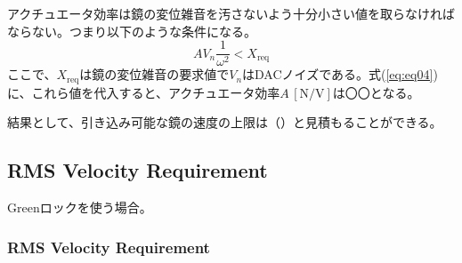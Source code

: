 \documentclass[a4paper,12pt]{jsarticle}
\begin{document}
アクチュエータ効率は鏡の変位雑音を汚さないよう十分小さい値を取らなければならない。つまり以下のような条件になる。
\begin{equation} \label{eq:eq04}
  A V_n  \frac{1}{\omega^2} < X_{\mathrm{req}}
\end{equation}
ここで、$X_{\mathrm{req}}$は鏡の変位雑音の要求値で$V_n$はDACノイズである。式(\ref{eq:eq04})に、これら値を代入すると、アクチュエータ効率$A\,\mathrm{[N/V]}$は〇〇となる。

結果として、引き込み可能な鏡の速度の上限は（）と見積もることができる。
\subsection{RMS Velocity Requirement}
Greenロックを使う場合。
\subsubsection{RMS Velocity Requirement}
\end{document}
